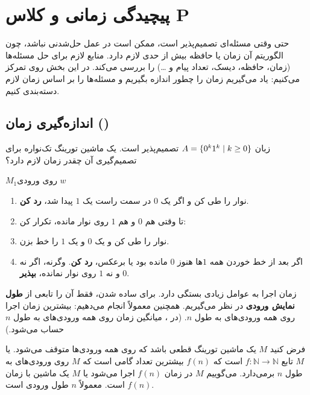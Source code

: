 \chapter{پیچیدگی زمانی و کلاس P}

حتی وقتی مسئله‌ای تصمیم‌پذیر است، ممکن است در عمل حل‌شدنی نباشد، چون الگوریتم آن زمان یا حافظه بیش از حدی لازم دارد.  منابع لازم برای حل مسئله‌ها (زمان، حافظه، دیسک، تعداد پیام و \dots) را بررسی می‌کند. در این بخش روی  تمرکز می‌کنیم: یاد می‌گیریم زمان را چطور اندازه بگیریم و مسئله‌ها را بر اساس زمان لازم دسته‌بندی کنیم.

\section{اندازه‌گیری زمان ()}

\begin{example}
زبان $A=\{0^k1^k\mid k\ge0\}$ تصمیم‌پذیر است. یک ماشین تورینگ تک‌نواره برای تصمیم‌گیری آن چقدر زمان لازم دارد؟
\begin{algo}{$M_1$}{روی ورودی $w$}
\begin{enumerate}
\item نوار را طی کن و اگر یک $0$ در سمت راست یک $1$ پیدا شد، \textbf{رد کن}.
\item تا وقتی هم $0$ و هم $1$ روی نوار مانده، تکرار کن:
\item \quad نوار را طی کن و یک $0$ و یک $1$ را خط بزن.
\item اگر بعد از خط خوردن همه $1$ها هنوز $0$ مانده بود یا برعکس، \textbf{رد کن}. وگرنه، اگر نه $0$ و نه $1$ روی نوار نمانده، \textbf{بپذیر}.
\end{enumerate}
\end{algo}
\end{example}

زمان اجرا به عوامل زیادی بستگی دارد. برای ساده شدن، فقط آن را تابعی از \textbf{طول نمایش ورودی} در نظر می‌گیریم. همچنین معمولاً  انجام می‌دهیم: بیشترین زمان اجرا روی همه ورودی‌های به طول $n$. (در ، میانگین زمان روی همه ورودی‌های به طول $n$ حساب می‌شود.)

\begin{definition}
فرض کنید $M$ یک ماشین تورینگ قطعی باشد که روی همه ورودی‌ها متوقف می‌شود.  یا  $M$ تابع $f:\mathbb{N}\to\mathbb{N}$ است که $f(n)$ بیشترین تعداد گامی است که $M$ روی ورودی‌های به طول $n$ برمی‌دارد. می‌گوییم $M$ در زمان $f(n)$ اجرا می‌شود یا $M$ یک ماشین با زمان $f(n)$ است. معمولاً $n$ طول ورودی است.
\end{definition}

